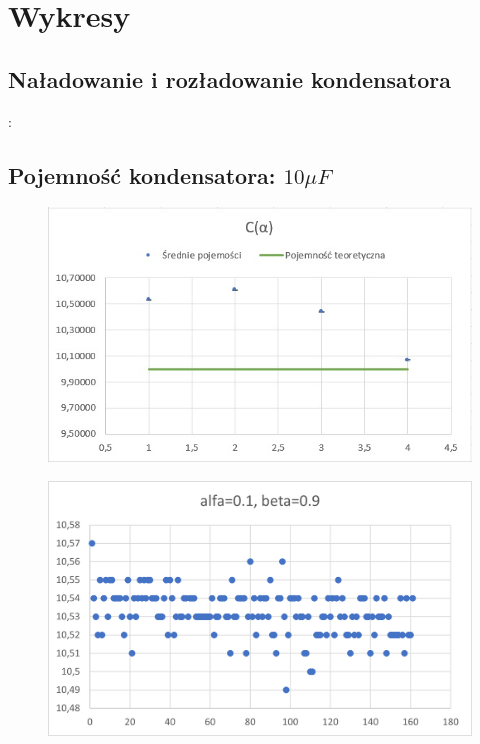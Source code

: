 \documentclass[12pt]{mwart}
\begin{document}
	\section{Wykresy}\label{wykresy}
	\subsection{Naładowanie i rozładowanie kondensatora}:
	
	\subsection{Pojemność kondensatora: $10 \mu F$}
	\begin{figure}[H]
		\centering
		\includegraphics{10_sr.jpg}
	\end{figure}
	\begin{figure}[H]
		\centering
		\includegraphics{10_a0.1.png}
	\end{figure}
\end{document}
